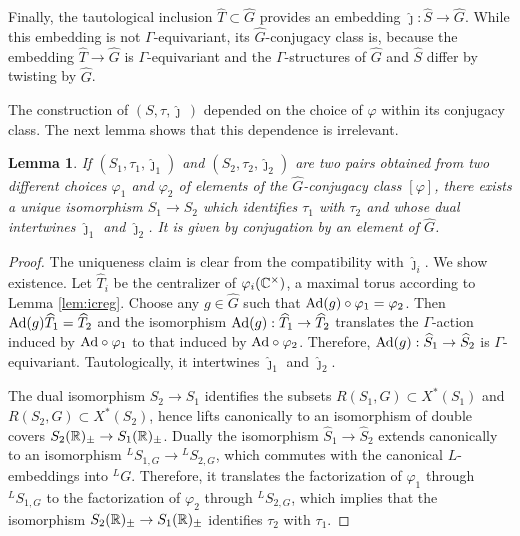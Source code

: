 \documentclass{article}
\newtheorem{lem}[thm]{Lemma}
\theoremstyle{definition}
\newtheorem{cns}[thm]{Construction}
\numberwithin{equation}{section}
\renewcommand{\-}{\hyp{}}
\newcommand{\warn}[1]{{\leavevmode\color{red}[#1]}}
\begin{document}
Finally, the tautological inclusion $\hat T \subset \hat G$ provides an embedding $\hat\jmath : \hat S \to \hat G$. While this embedding is not $\Gamma$-equivariant, its $\hat G$-conjugacy class is, because the embedding $\hat T \to \hat G$ is $\Gamma$-equivariant and the $\Gamma$-structures of $\hat G$ and $\hat S$ differ by twisting by $\hat G$.

The construction of $(S,\tau,\hat\jmath\,)$ depended on the choice of $\varphi$ within its conjugacy class. The next lemma shows that this dependence is irrelevant.

\begin{lem} \label{lem:a}
If $(S_1,\tau_1,\hat\jmath_1)$ and $(S_2,\tau_2,\hat\jmath_2)$ are two pairs obtained from two different choices $\varphi_1$ and $\varphi_2$ of elements of the $\hat G$-conjugacy class $[\varphi]$, there exists a unique isomorphism $S_1 \to S_2$ which identifies $\tau_1$ with $\tau_2$ and whose dual intertwines $\hat\jmath_1$ and $\hat\jmath_2$. It is given by conjugation by an element of $\hat G$.
\end{lem}
\begin{proof}
	The uniqueness claim is clear from the compatibility with $\hat\jmath_i$. We show existence. Let $\hat T_i$ be the centralizer of $\varphi_i(\mathbb{C}^\times)$, a maximal torus according to Lemma \ref{lem:icreg}. Choose any $g \in \hat G$ such that $\textrm{Ad}(g) \circ\varphi_1=\varphi_2$. Then $\textrm{Ad}(g)\widehat T_1=\widehat T_2$ and the isomorphism $\textrm{Ad}(g) : \widehat T_1 \to \widehat T_2$ translates the $\Gamma$-action induced by $\textrm{Ad}\circ\varphi_1$ to that induced by $\textrm{Ad}\circ\varphi_2$. Therefore, $\textrm{Ad}(g) : \widehat S_1 \to \widehat S_2$ is $\Gamma$-equivariant. Tautologically, it intertwines $\hat\jmath_1$ and $\hat\jmath_2$.

	The dual isomorphism $S_2 \to S_1$ identifies the subsets $R(S_1,G) \subset X^*(S_1)$ and $R(S_2,G) \subset X^*(S_2)$, hence lifts canonically to an isomorphism of double covers $S_2(\mathbb{R})_\pm \to S_1(\mathbb{R})_\pm$. Dually the isomorphism $\hat S_1 \to \hat S_2$ extends canonically to an isomorphism $^LS_{1,G} \to {^LS_{2,G}}$, which commutes with the canonical $L$\-embeddings into $^LG$. Therefore, it translates the factorization of $\varphi_1$ through $^LS_{1,G}$ to the factorization of $\varphi_2$ through $^LS_{2,G}$, which implies that the isomorphism $S_2(\mathbb{R})_\pm \to S_1(\mathbb{R})_\pm$ identifies $\tau_2$ with $\tau_1$.
\end{proof}

	
\end{document}
